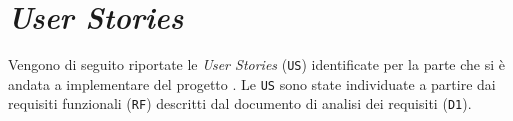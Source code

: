 \chapter{\textit{User Stories}}
Vengono di seguito riportate le \textit{User Stories} (\texttt{US}) identificate per la parte che si è andata a implementare del progetto \ProjectTitle. Le \texttt{US} sono state individuate a partire dai requisiti funzionali (\texttt{RF}) descritti dal documento di analisi dei requisiti (\texttt{D1}).

\subsubsection{}